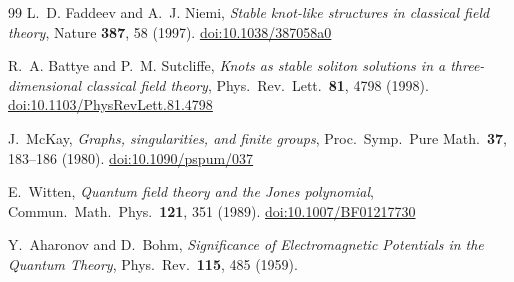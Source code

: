 \documentclass[11pt,a4paper]{article}
\theoremstyle{definition}\newtheorem{definition}[theorem]{Definition}
\theoremstyle{remark}
\begin{document}
\begin{thebibliography}{99}
L.~D. Faddeev and A.~J. Niemi,
\textit{Stable knot-like structures in classical field theory},
Nature \textbf{387}, 58 (1997).
\href{https://doi.org/10.1038/387058a0}{doi:10.1038/387058a0}

R.~A. Battye and P.~M. Sutcliffe,
\textit{Knots as stable soliton solutions in a three-dimensional classical
field theory},
Phys.\ Rev.\ Lett.\ \textbf{81}, 4798 (1998).
\href{https://doi.org/10.1103/PhysRevLett.81.4798}{doi:10.1103/PhysRevLett.81.4798}

J.~McKay,
\textit{Graphs, singularities, and finite groups},
Proc.\ Symp.\ Pure Math.\ \textbf{37}, 183--186 (1980).
\href{https://doi.org/10.1090/pspum/037}{doi:10.1090/pspum/037}


E.~Witten,
\textit{Quantum field theory and the Jones polynomial},
Commun.\ Math.\ Phys.\ \textbf{121}, 351 (1989).
\href{https://doi.org/10.1007/BF01217730}{doi:10.1007/BF01217730}

Y.~Aharonov and D.~Bohm,
\textit{Significance of Electromagnetic Potentials in the Quantum Theory},
Phys.\ Rev.\ \textbf{115}, 485 (1959).

\end{thebibliography}
\end{document}
